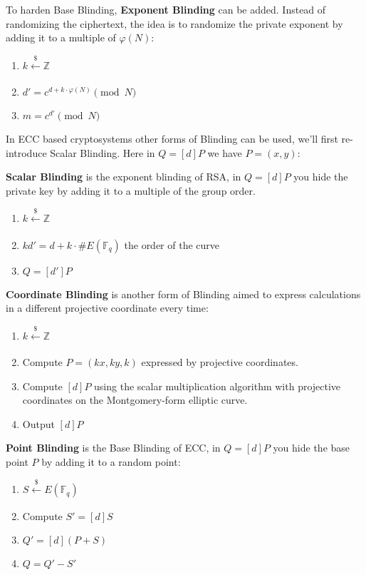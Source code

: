 \documentclass[a4paper,11pt]{article}
\begin{document}
To harden Base Blinding, \textbf{Exponent Blinding} can be added. Instead of randomizing the ciphertext, the idea is to randomize the private exponent by adding it to a multiple of $\varphi(N)$:

\begin{enumerate}
    \item{$k \xleftarrow[]{\$} \mathbb{Z}$}
    \item{$d' = c^{d + k \cdot \varphi(N)} \pmod{N}$}
    \item{$m = c^{d'} \pmod{N}$}
\end{enumerate}

In ECC based cryptosystems other forms of Blinding can be used, we'll first re-introduce Scalar Blinding. Here in $Q = [d]P$ we have $P=(x,y)$:

\textbf{Scalar Blinding} is the exponent blinding of RSA, in $Q = [d]P$ you hide the private key by adding it to a multiple of the group order.

\begin{enumerate}
\item{$k \xleftarrow[]{\$} \mathbb{Z}$}
\item{$k d' = d + k \cdot \#E(\mathbb{F}_q)$ the order of the curve}
\item{$Q = [d']P$}
\end{enumerate}

\textbf{Coordinate Blinding} is another form of Blinding aimed to express calculations in a different projective coordinate every time:

\begin{enumerate}
\item{$k \xleftarrow[]{\$} \mathbb{Z}$}
\item{Compute $P = (kx, ky, k)$ expressed by projective coordinates.}
\item{Compute $[d]P$ using the scalar multiplication algorithm with projective coordinates on the Montgomery-form elliptic curve.}
\item{Output $[d]P$}
\end{enumerate}

\textbf{Point Blinding} is the Base Blinding of ECC, in $Q = [d]P$ you hide the base point $P$ by adding it to a random point:

\begin{enumerate}
\item{$S \xleftarrow[]{\$} E(\mathbb{F}_q)$}
\item{Compute $S' = [d]S$}
\item{$Q' = [d](P + S)$}
\item{$Q = Q' - S'$}
\end{enumerate}
\end{document}
